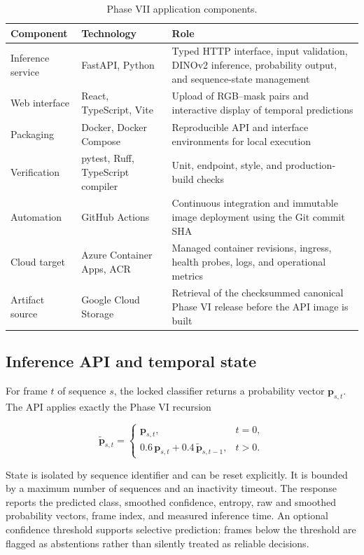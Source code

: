 \begin{table}[H]
\centering
\small
\caption{Phase VII application components.}
\label{tab:phase7_components}
\begin{tabularx}{\textwidth}{p{3.2cm}p{3.0cm}X}
\toprule
Component & Technology & Role\\
\midrule
Inference service & FastAPI, Python & Typed HTTP interface, input validation, DINOv2 inference, probability output, and sequence-state management\\
Web interface & React, TypeScript, Vite & Upload of RGB--mask pairs and interactive display of temporal predictions\\
Packaging & Docker, Docker Compose & Reproducible API and interface environments for local execution\\
Verification & pytest, Ruff, TypeScript compiler & Unit, endpoint, style, and production-build checks\\
Automation & GitHub Actions & Continuous integration and immutable image deployment using the Git commit SHA\\
Cloud target & Azure Container Apps, ACR & Managed container revisions, ingress, health probes, logs, and operational metrics\\
Artifact source & Google Cloud Storage & Retrieval of the checksummed canonical Phase VI release before the API image is built\\
\bottomrule
\end{tabularx}
\end{table}

\subsection{Inference API and temporal state}

For frame $t$ of sequence $s$, the locked classifier returns a probability vector
$\mathbf{p}_{s,t}$. The API applies exactly the Phase VI recursion

\begin{equation}
\widetilde{\mathbf{p}}_{s,t}=
\begin{cases}
\mathbf{p}_{s,t}, & t=0,\\
0.6\,\mathbf{p}_{s,t}+0.4\,\widetilde{\mathbf{p}}_{s,t-1}, & t>0.
\end{cases}
\end{equation}

State is isolated by sequence identifier and can be reset explicitly. It is bounded by a
maximum number of sequences and an inactivity timeout. The response reports the predicted
class, smoothed confidence, entropy, raw and smoothed probability vectors, frame index, and
measured inference time. An optional confidence threshold supports selective prediction:
frames below the threshold are flagged as abstentions rather than silently treated as
reliable decisions.

